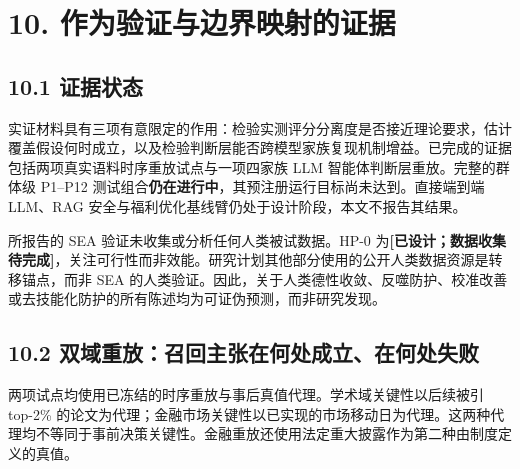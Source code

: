 \documentclass[
  chinese,
  11pt]{article}
\begin{document}
\section{10. 作为验证与边界映射的证据}\label{ux4f5cux4e3aux9a8cux8bc1ux4e0eux8fb9ux754cux6620ux5c04ux7684ux8bc1ux636e}

\subsection{10.1 证据状态}\label{ux8bc1ux636eux72b6ux6001}

实证材料具有三项有意限定的作用：检验实测评分分离度是否接近理论要求，估计覆盖假设何时成立，以及检验判断层能否跨模型家族复现机制增益。已完成的证据包括两项真实语料时序重放试点与一项四家族 LLM 智能体判断层重放。完整的群体级 P1--P12 测试组合\textbf{仍在进行中}，其预注册运行目标尚未达到。直接端到端 LLM、RAG 安全与福利优化基线臂仍处于设计阶段，本文不报告其结果。

所报告的 SEA 验证未收集或分析任何人类被试数据。HP-0 为\textbf{{[}已设计；数据收集待完成{]}}，关注可行性而非效能。研究计划其他部分使用的公开人类数据资源是转移锚点，而非 SEA 的人类验证。因此，关于人类德性收敛、反噬防护、校准改善或去技能化防护的所有陈述均为可证伪预测，而非研究发现。

\subsection{10.2 双域重放：召回主张在何处成立、在何处失败}\label{ux53ccux57dfux91cdux653eux53ecux56deux4e3bux5f20ux5728ux4f55ux5904ux6210ux7acbux5728ux4f55ux5904ux5931ux8d25}

两项试点均使用已冻结的时序重放与事后真值代理。学术域关键性以后续被引 top-2\% 的论文为代理；金融市场关键性以已实现的市场移动日为代理。这两种代理均不等同于事前决策关键性。金融重放还使用法定重大披露作为第二种由制度定义的真值。
\end{document}
